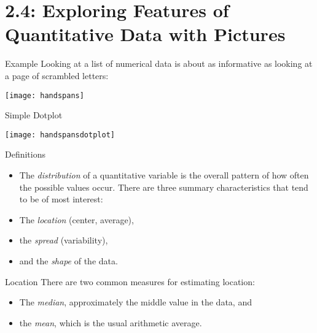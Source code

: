 \documentclass[Lecture.tex]{subfiles}
\begin{document}
\section{2.4: Exploring Features of Quantitative Data with Pictures}


\begin{frame}{Example}
Looking at a list of numerical data is about as informative as looking at a page of scrambled letters:
\begin{center}
\texttt{[image: handspans]}
\end{center}
 \end{frame}

\begin{frame}{Simple Dotplot}
\begin{center}
\texttt{[image: handspansdotplot]}
\end{center}
\end{frame}

\begin{frame}{Definitions}
\begin{defn}
    \begin{itemize}
    \item<1->
      The {\it distribution} of a quantitative variable is the overall pattern of how often the possible values occur.  There are three summary characteristics that tend to be of most interest:
    \item<2->
      The {\it location} (center, average),
    \item<3->
      the {\it spread} (variability),
    \item<4->
    and the {\it shape} of the data.
    \end{itemize}
  \end{defn}
\end{frame}

\begin{frame}{Location}
There are two common measures for estimating location:
\begin{defn}
   \begin{itemize}
   \item<1->
     The {\it median}, approximately the middle value in the data, and
   \item<2->
     the {\it mean}, which is the usual arithmetic average.
   \end{itemize}
\end{defn}
\end{frame}
\end{document}

